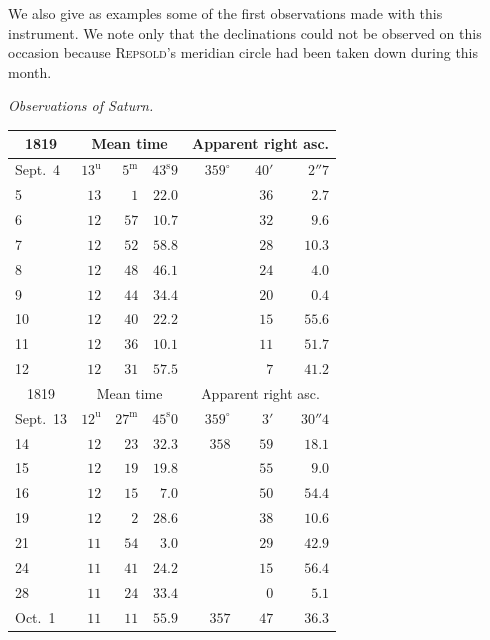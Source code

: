 \par\indent We also give as examples some of the first observations made with this instrument. We note only that the declinations could not be observed on this occasion because \textsc{Repsold}’s meridian circle had been taken down during this month.

\begin{center}
\emph{Observations of Saturn.}

\small
\setlength{\tabcolsep}{5pt}
\begin{tabular}{l|rrr|rrr}
\multicolumn{1}{c|}{1819}  &  \multicolumn{3}{c|}{Mean time}  &  \multicolumn{3}{c}{Apparent right asc.}  \\
\hline
Sept.\ 4  &  $13^{\mathrm u}$  &  $5^{\mathrm m}$  &  $43^{\mathrm s}9$  &  $359^\circ$  &  $40'$  &  $2''7$  \\
5  &  $13$  &  $1$  &  $22.0$  &   &  $36$  &  $2.7$  \\
6  &  $12$  &  $57$  &  $10.7$  &   &  $32$  &  $9.6$  \\
7  &  $12$  &  $52$  &  $58.8$  &   &  $28$  &  $10.3$  \\
8  &  $12$  &  $48$  &  $46.1$  &   &  $24$  &  $4.0$  \\
9  &  $12$  &  $44$  &  $34.4$  &   &  $20$  &  $0.4$  \\
10  &  $12$  &  $40$  &  $22.2$  &   &  $15$  &  $55.6$  \\
11  &  $12$  &  $36$  &  $10.1$  &   &  $11$  &  $51.7$  \\
12  &  $12$  &  $31$  &  $57.5$  &   &  $7$  &  $41.2$  \\
\hline
 \multicolumn{1}{c|}{1819}  &  \multicolumn{3}{c|}{Mean time}  &  \multicolumn{3}{c}{Apparent right asc.}  \\
\hline
 Sept.\ 13  &  $12^{\mathrm u}$  &  $27^{\mathrm m}$  &  $45^{\mathrm s}0$  &  $359^\circ$  &  $3'$  &  $30''4$  \\
 14  &  $12$  &  $23$  &  $32.3$  &  $358$  &  $59$  &  $18.1$  \\
 15  &  $12$  &  $19$  &  $19.8$  &   &  $55$  &  $9.0$  \\
 16  &  $12$  &  $15$  &  $7.0$  &   &  $50$  &  $54.4$  \\
 19  &  $12$  &  $2$  &  $28.6$  &   &  $38$  &  $10.6$  \\
 21  &  $11$  &  $54$  &  $3.0$  &   &  $29$  &  $42.9$  \\
 24  &  $11$  &  $41$  &  $24.2$  &   &  $15$  &  $56.4$  \\
 28  &  $11$  &  $24$  &  $33.4$  &   &  $0$  &  $5.1$  \\
 Oct.\ 1  &  $11$  &  $11$  &  $55.9$  &  $357$  &  $47$  &  $36.3$  \\
\end{tabular}
\end{center}

